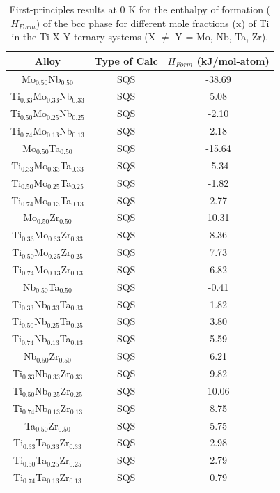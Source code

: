 \newpage
\begin{table}[H]
	\caption{First-principles results at 0 K for the enthalpy of formation ($H_{Form}$) of the bcc phase for different mole fractions (x) of Ti in the Ti-X-Y ternary systems (X $\neq$ Y = Mo, Nb, Ta, Zr).}
	\centering
	\begin{tabular}{ c c c }
		\hline
		Alloy & Type of Calc & $H_{Form}$ (kJ/mol-atom)\\
		\hline
		Mo$_{0.50}$Nb$_{0.50}$ & SQS & -38.69\\
		Ti$_{0.33}$Mo$_{0.33}$Nb$_{0.33}$ & SQS & 5.08\\
		Ti$_{0.50}$Mo$_{0.25}$Nb$_{0.25}$ & SQS & -2.10\\
		Ti$_{0.74}$Mo$_{0.13}$Nb$_{0.13}$ & SQS & 2.18\\
		Mo$_{0.50}$Ta$_{0.50}$ & SQS & -15.64\\
		Ti$_{0.33}$Mo$_{0.33}$Ta$_{0.33}$ & SQS & -5.34\\
		Ti$_{0.50}$Mo$_{0.25}$Ta$_{0.25}$ & SQS & -1.82\\
		Ti$_{0.74}$Mo$_{0.13}$Ta$_{0.13}$ & SQS & 2.77\\
		Mo$_{0.50}$Zr$_{0.50}$ & SQS & 10.31\\
		Ti$_{0.33}$Mo$_{0.33}$Zr$_{0.33}$ & SQS & 8.36\\
		Ti$_{0.50}$Mo$_{0.25}$Zr$_{0.25}$ & SQS & 7.73\\
		Ti$_{0.74}$Mo$_{0.13}$Zr$_{0.13}$ & SQS & 6.82\\
		Nb$_{0.50}$Ta$_{0.50}$ & SQS & -0.41\\
		Ti$_{0.33}$Nb$_{0.33}$Ta$_{0.33}$ & SQS & 1.82\\
		Ti$_{0.50}$Nb$_{0.25}$Ta$_{0.25}$ & SQS & 3.80\\
		Ti$_{0.74}$Nb$_{0.13}$Ta$_{0.13}$ & SQS & 5.59\\
		Nb$_{0.50}$Zr$_{0.50}$ & SQS & 6.21\\
		Ti$_{0.33}$Nb$_{0.33}$Zr$_{0.33}$ & SQS & 9.82\\
		Ti$_{0.50}$Nb$_{0.25}$Zr$_{0.25}$ & SQS & 10.06\\
		Ti$_{0.74}$Nb$_{0.13}$Zr$_{0.13}$ & SQS & 8.75\\
		Ta$_{0.50}$Zr$_{0.50}$ & SQS & 5.75\\
		Ti$_{0.33}$Ta$_{0.33}$Zr$_{0.33}$ & SQS & 2.98\\
		Ti$_{0.50}$Ta$_{0.25}$Zr$_{0.25}$ & SQS & 2.79\\
		Ti$_{0.74}$Ta$_{0.13}$Zr$_{0.13}$ & SQS & 0.79\\
		\hline
	\end{tabular}
	\label{Ch3-table:ternhform}
\end{table}
\clearpage

